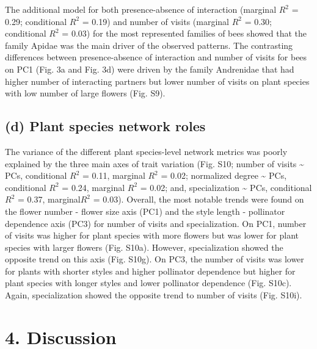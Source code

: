 \documentclass[
  12pt,
  a4paper,
]{article}
\begin{document}
The additional model for both presence-absence of interaction (marginal \(R^{2}\) = 0.29; conditional \(R^{2}\) = 0.19) and number of visits (marginal \(R^{2}\) = 0.30; conditional \(R^{2}\) = 0.03) for the most represented families of bees showed that the family Apidae was the main driver of the observed patterns. The contrasting differences between presence-absence of interaction and number of visits for bees on PC1 (Fig. 3a and Fig. 3d) were driven by the family Andrenidae that had higher number of interacting partners but lower number of visits on plant species with low number of large flowers (Fig. S9).

\hypertarget{d-plant-species-network-roles}{%
\subsection{(d) Plant species network roles}\label{d-plant-species-network-roles}}

The variance of the different plant species-level network metrics was poorly explained by the three main axes of trait variation (Fig. S10; number of visits \textasciitilde{} PCs, conditional \(R^{2}\) = 0.11, marginal \(R^{2}\) = 0.02; normalized degree \textasciitilde{} PCs, conditional \(R^{2}\) = 0.24, marginal \(R^{2}\) = 0.02; and, specialization \textasciitilde{} PCs, conditional \(R^{2}\) = 0.37, marginal\(R^{2}\) = 0.03). Overall, the most notable trends were found on the flower number - flower size axis (PC1) and the style length - pollinator dependence axis (PC3) for number of visits and specialization. On PC1, number of visits was higher for plant species with more flowers but was lower for plant species with larger flowers (Fig. S10a). However, specialization showed the opposite trend on this axis (Fig. S10g). On PC3, the number of visits was lower for plants with shorter styles and higher pollinator dependence but higher for plant species with longer styles and lower pollinator dependence (Fig. S10c). Again, specialization showed the opposite trend to number of visits (Fig. S10i).

\hypertarget{discussion}{%
\section{4. Discussion}\label{discussion}}
\end{document}

